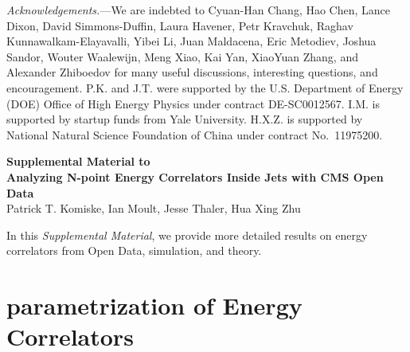 \documentclass[aps,prl,twocolumn,showpacs,10pt,superscriptaddress,preprintnumbers,nofootinbib,longbibliography]{revtex4-1}
\begin{document}
\emph{Acknowledgements.}---We are indebted to Cyuan-Han Chang, Hao Chen, Lance Dixon, David Simmons-Duffin, Laura Havener, Petr Kravchuk, Raghav Kunnawalkam-Elayavalli, Yibei Li, Juan Maldacena, Eric Metodiev, Joshua Sandor, Wouter Waalewijn, Meng Xiao, Kai Yan, XiaoYuan Zhang, and Alexander Zhiboedov for many useful discussions, interesting questions, and encouragement.
%
P.K. and J.T. were supported by the U.S. Department of Energy (DOE) Office of High Energy Physics under contract DE-SC0012567.
%
I.M. is supported by startup funds from Yale University.
%
H.X.Z. is supported by National Natural Science Foundation of China under contract No.~11975200.


%



\newpage

\onecolumngrid

\newpage

\parindent=18pt

\begin{center}
{\large \bf Supplemental Material to \\ {\color{red}A}nalyzing {\color{red}N}-point {\color{red}E}nergy {\color{red}C}orrelator{\color{red}s} Inside Jets with CMS Open Data}
\\
\vspace{3mm}
Patrick T. Komiske, Ian Moult, Jesse Thaler, Hua Xing Zhu\\
\vspace{1mm}
\end{center}


In this \emph{Supplemental Material}, we provide more detailed results on energy correlators from Open Data, simulation, and theory. 

\section{parametrization of Energy Correlators}
\label{sec:parametrization}
\end{document}
